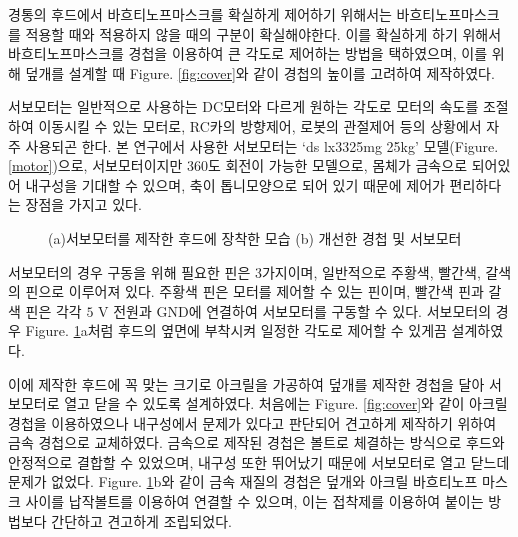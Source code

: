 경통의 후드에서 바흐티노프마스크를 확실하게 제어하기 위해서는 바흐티노프마스크를 적용할 때와 적용하지 않을 때의 구분이 확실해야한다. 이를 확실하게 하기 위해서 바흐티노프마스크를 경첩을 이용하여 큰 각도로 제어하는 방법을 택하였으며, 이를 위해 덮개를 설계할 때 \textrm{Figure}. \ref{fig:cover}와 같이 경첩의 높이를 고려하여 제작하였다.

서보모터는 일반적으로 사용하는 DC모터와 다르게 원하는 각도로 모터의 속도를 조절하여 이동시킬 수 있는 모터로,  RC카의 방향제어, 로봇의 관절제어 등의 상황에서 자주 사용되곤 한다. 본 연구에서 사용한 서보모터는 ‘ds lx3325mg 25kg’ 모델(\textrm{Figure}. \ref{motor})으로, 서보모터이지만 360도 회전이 가능한 모델으로, 몸체가 금속으로 되어있어 내구성을 기대할 수 있으며, 축이 톱니모양으로 되어 있기 때문에 제어가 편리하다는 장점을 가지고 있다.



\begin{figure}[ht]
	\begin{center}
	\end{center}
	\caption{(a)서보모터를 제작한 후드에 장착한 모습 (b) 개선한 경첩 및 서보모터}
	\label{servohinge}
\end{figure}

서보모터의 경우 구동을 위해 필요한 핀은 3가지이며, 일반적으로 주황색, 빨간색, 갈색의 핀으로 이루어져 있다. 주황색 핀은 모터를 제어할 수 있는 핀이며, 빨간색 핀과 갈색 핀은 각각 $\textrm{5 V}$ 전원과 GND에 연결하여 서보모터를 구동할 수 있다. 서보모터의 경우 \textrm{Figure}. \ref{servohinge}a처럼 후드의 옆면에 부착시켜 일정한 각도로 제어할 수 있게끔 설계하였다.

이에 제작한 후드에 꼭 맞는 크기로 아크릴을 가공하여 덮개를 제작한 경첩을 달아 서보모터로 열고 닫을 수 있도록 설계하였다. 처음에는 \textrm{Figure}. \ref{fig:cover}와 같이 아크릴 경첩을 이용하였으나 내구성에서 문제가 있다고 판단되어 견고하게 제작하기 위하여 금속 경첩으로 교체하였다. 금속으로 제작된 경첩은 볼트로 체결하는 방식으로 후드와 안정적으로 결합할 수 있었으며, 내구성 또한 뛰어났기 때문에 서보모터로 열고 닫느데 문제가 없었다. \textrm{Figure}. \ref{servohinge}b와 같이 금속 재질의 경첩은 덮개와 아크릴 바흐티노프 마스크 사이를 납작볼트를 이용하여 연결할 수 있으며, 이는 접착제를 이용하여 붙이는 방법보다 간단하고 견고하게 조립되었다.


